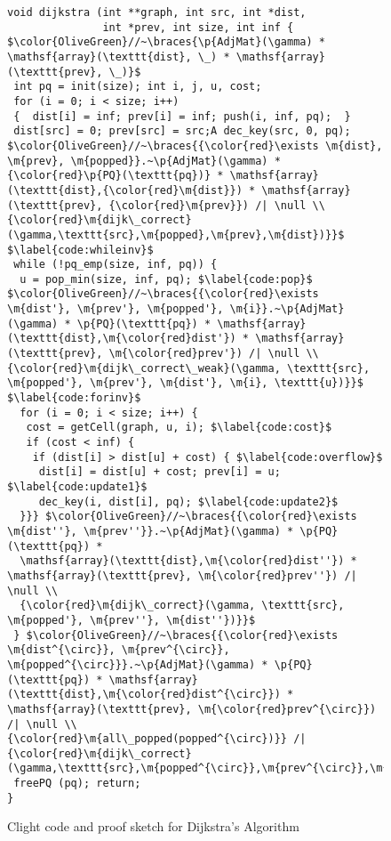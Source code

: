 
\begin{figure}[t]

\begin{lstlisting}[mathescape=true,showlines=true]
void dijkstra (int **graph, int src, int *dist, 
               int *prev, int size, int inf {
$\color{OliveGreen}//~\braces{\p{AdjMat}(\gamma) *
\mathsf{array}(\texttt{dist}, \_) * \mathsf{array}(\texttt{prev}, \_)}$
 int pq = init(size); int i, j, u, cost;
 for (i = 0; i < size; i++)
 {  dist[i] = inf; prev[i] = inf; push(i, inf, pq);  }
 dist[src] = 0; prev[src] = src;A dec_key(src, 0, pq);
$\color{OliveGreen}//~\braces{{\color{red}\exists \m{dist}, \m{prev}, \m{popped}}.~\p{AdjMat}(\gamma) * {\color{red}\p{PQ}(\texttt{pq})} * \mathsf{array}(\texttt{dist},{\color{red}\m{dist}}) * \mathsf{array}(\texttt{prev}, {\color{red}\m{prev}}) /| \null \\
{\color{red}\m{dijk\_correct}(\gamma,\texttt{src},\m{popped},\m{prev},\m{dist})}}$ $\label{code:whileinv}$
 while (!pq_emp(size, inf, pq)) {
  u = pop_min(size, inf, pq); $\label{code:pop}$
$\color{OliveGreen}//~\braces{{\color{red}\exists \m{dist'}, \m{prev'}, \m{popped'}, \m{i}}.~\p{AdjMat}(\gamma) * \p{PQ}(\texttt{pq}) * \mathsf{array}(\texttt{dist},\m{\color{red}dist'}) * \mathsf{array}(\texttt{prev}, \m{\color{red}prev'}) /| \null \\
{\color{red}\m{dijk\_correct\_weak}(\gamma, \texttt{src}, \m{popped'}, \m{prev'}, \m{dist'}, \m{i}, \texttt{u})}}$ $\label{code:forinv}$
  for (i = 0; i < size; i++) {
   cost = getCell(graph, u, i); $\label{code:cost}$
   if (cost < inf) {
    if (dist[i] > dist[u] + cost) { $\label{code:overflow}$
     dist[i] = dist[u] + cost; prev[i] = u; $\label{code:update1}$ 
     dec_key(i, dist[i], pq); $\label{code:update2}$
  }}} $\color{OliveGreen}//~\braces{{\color{red}\exists \m{dist''}, \m{prev''}}.~\p{AdjMat}(\gamma) * \p{PQ}(\texttt{pq}) *
  \mathsf{array}(\texttt{dist},\m{\color{red}dist''}) * \mathsf{array}(\texttt{prev}, \m{\color{red}prev''}) /| \null \\
  {\color{red}\m{dijk\_correct}(\gamma, \texttt{src}, \m{popped'}, \m{prev''}, \m{dist''})}}$
 } $\color{OliveGreen}//~\braces{{\color{red}\exists \m{dist^{\circ}}, \m{prev^{\circ}}, \m{popped^{\circ}}}.~\p{AdjMat}(\gamma) * \p{PQ}(\texttt{pq}) * \mathsf{array}(\texttt{dist},\m{\color{red}dist^{\circ}}) * \mathsf{array}(\texttt{prev}, \m{\color{red}prev^{\circ}}) /| \null \\
{\color{red}\m{all\_popped(popped^{\circ})}} /|
{\color{red}\m{dijk\_correct}(\gamma,\texttt{src},\m{popped^{\circ}},\m{prev^{\circ}},\m{dist^{\circ}})}}$
 freePQ (pq); return; 
}
\end{lstlisting}
\vspace{-1em}
\caption{Clight code and proof sketch for Dijkstra's Algorithm}
\vspace{-1em}
\label{fig:decorated}
\end{figure} 